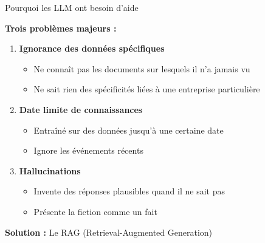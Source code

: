 \begin{frame}{Pourquoi les LLM ont besoin d'aide}

\textbf{Trois problèmes majeurs :}

\vspace{0.3cm}

\begin{enumerate}
    \item<+-> \textbf{Ignorance des données spécifiques}
        \begin{itemize}
            \item Ne connaît pas les documents sur lesquels il n'a jamais vu
            \item Ne sait rien des spécificités liées à une entreprise particulière
        \end{itemize}
    
    \vspace{0.2cm}
    \item<+-> \textbf{Date limite de connaissances}
        \begin{itemize}
            \item Entraîné sur des données jusqu'à une certaine date
            \item Ignore les événements récents
        \end{itemize}
    
    \vspace{0.2cm}
    \item<+-> \textbf{Hallucinations}
        \begin{itemize}
            \item Invente des réponses plausibles quand il ne sait pas
            \item Présente la fiction comme un fait
        \end{itemize}
\end{enumerate}

\vspace{0.3cm}
\textbf{Solution :} Le RAG (Retrieval-Augmented Generation)

\end{frame}

